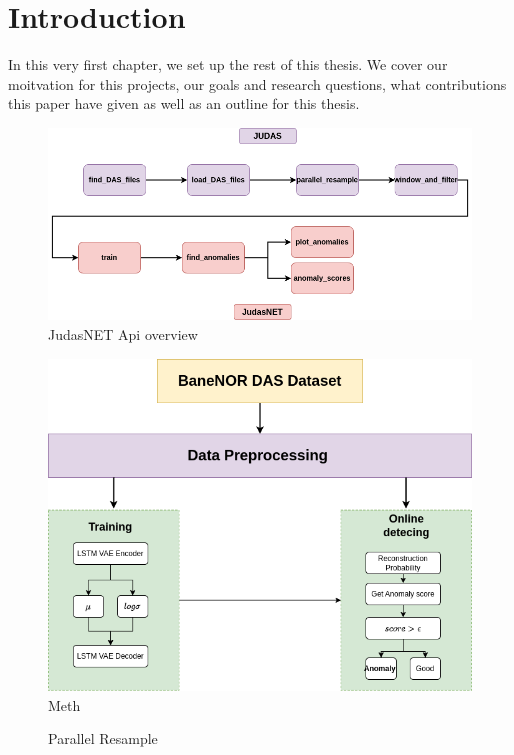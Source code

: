 \chapter{Introduction}
\label{chap:introduction}

In this very first chapter, we set up the rest of this thesis. We cover our moitvation for this projects, our goals and research questions, what contributions this paper have given as well as an outline for this thesis.



\begin{figure}[h]
    \centering
    \includegraphics[scale=.5]{figures/api_overview.png}
    \caption{JudasNET Api overview}
    \label{fig:judasnet_overview}
\end{figure}

\begin{figure}[h]
    \centering
    \includegraphics[scale=.5]{figures/methodflow.png}
    \caption{Meth}
    \label{fig:methodflow}
\end{figure}

\begin{figure}[h]
    \centering
    
    \caption{Parallel Resample}
    \label{fig:parallel_resample}
\end{figure}





